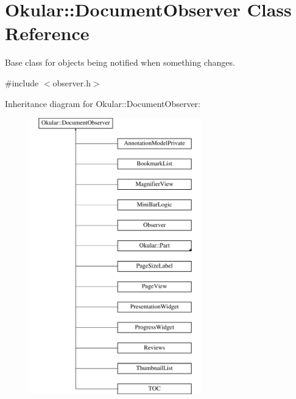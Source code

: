 \hypertarget{classOkular_1_1DocumentObserver}{\section{Okular\+:\+:Document\+Observer Class Reference}
\label{classOkular_1_1DocumentObserver}
}


Base class for objects being notified when something changes.  




{\ttfamily \#include $<$observer.\+h$>$}

Inheritance diagram for Okular\+:\+:Document\+Observer\+:\begin{figure}[H]
\begin{center}
\leavevmode
\includegraphics[height=12.000000cm]{classOkular_1_1DocumentObserver}
\end{center}
\end{figure}

